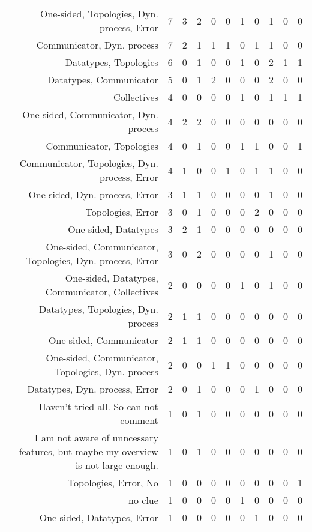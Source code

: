 {\begin{landscape}
\begin{longtable}[htb]{r|c|c|c|c|c|c|c|c|c|c}
{One-sided, Topologies, Dyn. process, Error} & 7 & 3 & 2 & 0 & 0 & 1 & 0 & 1 & 0 & 0 \\%
{Communicator, Dyn. process} & 7 & 2 & 1 & 1 & 1 & 0 & 1 & 1 & 0 & 0 \\%
{Datatypes, Topologies} & 6 & 0 & 1 & 0 & 0 & 1 & 0 & 2 & 1 & 1 \\%
{Datatypes, Communicator} & 5 & 0 & 1 & 2 & 0 & 0 & 0 & 2 & 0 & 0 \\%
{Collectives} & 4 & 0 & 0 & 0 & 0 & 1 & 0 & 1 & 1 & 1 \\%
{One-sided, Communicator, Dyn. process} & 4 & 2 & 2 & 0 & 0 & 0 & 0 & 0 & 0 & 0 \\%
{Communicator, Topologies} & 4 & 0 & 1 & 0 & 0 & 1 & 1 & 0 & 0 & 1 \\%
{Communicator, Topologies, Dyn. process, Error} & 4 & 1 & 0 & 0 & 1 & 0 & 1 & 1 & 0 & 0 \\%
{One-sided, Dyn. process, Error} & 3 & 1 & 1 & 0 & 0 & 0 & 0 & 1 & 0 & 0 \\%
{Topologies, Error} & 3 & 0 & 1 & 0 & 0 & 0 & 2 & 0 & 0 & 0 \\%
{One-sided, Datatypes} & 3 & 2 & 1 & 0 & 0 & 0 & 0 & 0 & 0 & 0 \\%
{One-sided, Communicator, Topologies, Dyn. process, Error} & 3 & 0 & 2 & 0 & 0 & 0 & 0 & 1 & 0 & 0 \\%
{One-sided, Datatypes, Communicator, Collectives} & 2 & 0 & 0 & 0 & 0 & 1 & 0 & 1 & 0 & 0 \\%
{Datatypes, Topologies, Dyn. process} & 2 & 1 & 1 & 0 & 0 & 0 & 0 & 0 & 0 & 0 \\%
{One-sided, Communicator} & 2 & 1 & 1 & 0 & 0 & 0 & 0 & 0 & 0 & 0 \\%
{One-sided, Communicator, Topologies, Dyn. process} & 2 & 0 & 0 & 1 & 1 & 0 & 0 & 0 & 0 & 0 \\%
{Datatypes, Dyn. process, Error} & 2 & 0 & 1 & 0 & 0 & 0 & 1 & 0 & 0 & 0 \\%
{Haven't tried all. So can not comment} & 1 & 0 & 1 & 0 & 0 & 0 & 0 & 0 & 0 & 0 \\%
{I am not aware of unncessary features, but maybe my overview is not large enough.} & 1 & 0 & 1 & 0 & 0 & 0 & 0 & 0 & 0 & 0 \\%
{Topologies, Error, No} & 1 & 0 & 0 & 0 & 0 & 0 & 0 & 0 & 0 & 1 \\%
{no clue} & 1 & 0 & 0 & 0 & 0 & 1 & 0 & 0 & 0 & 0 \\%
{One-sided, Datatypes, Error} & 1 & 0 & 0 & 0 & 0 & 0 & 1 & 0 & 0 & 0 \\%

\end{longtable}
\end{landscape}}
